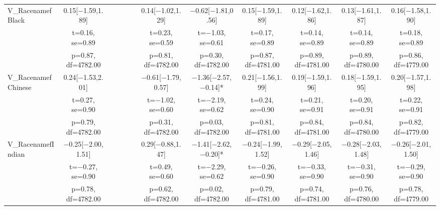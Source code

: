 \documentclass[]{report}
\begin{document}
\begin{table}
{\begin{tabular}[t]{lccccccccccc}
		V\_RacenamefBlack & \num{0.15}[\num{-1.59},\num{1.89}] &  &  &  &  & \num{0.14}[\num{-1.02},\num{1.29}] & \num{-0.62}[\num{-1.81},\num{0.56}] & \num{0.15}[\num{-1.59},\num{1.89}] & \num{0.12}[\num{-1.62},\num{1.86}] & \num{0.13}[\num{-1.61},\num{1.87}] & \num{0.16}[\num{-1.58},\num{1.90}]\\
		& t=\num{0.16}, se=\num{0.89} &  &  &  &  & t=\num{0.23}, se=\num{0.59} & t=\num{-1.03}, se=\num{0.61} & t=\num{0.17}, se=\num{0.89} & t=\num{0.14}, se=\num{0.89} & t=\num{0.14}, se=\num{0.89} & t=\num{0.18}, se=\num{0.89}\\
		& p=\num{0.87}, df=\num{4782.00} &  &  &  &  & p=\num{0.81}, df=\num{4782.00} & p=\num{0.30}, df=\num{4782.00} & p=\num{0.87}, df=\num{4781.00} & p=\num{0.89}, df=\num{4781.00} & p=\num{0.89}, df=\num{4780.00} & p=\num{0.86}, df=\num{4779.00}\\
		V\_RacenamefChinese & \num{0.24}[\num{-1.53},\num{2.01}] &  &  &  &  & \num{-0.61}[\num{-1.79},\num{0.57}] & \num{-1.36}[\num{-2.57},\num{-0.14}]* & \num{0.21}[\num{-1.56},\num{1.99}] & \num{0.19}[\num{-1.59},\num{1.96}] & \num{0.18}[\num{-1.59},\num{1.95}] & \num{0.20}[\num{-1.57},\num{1.98}]\\
		& t=\num{0.27}, se=\num{0.90} &  &  &  &  & t=\num{-1.02}, se=\num{0.60} & t=\num{-2.19}, se=\num{0.62} & t=\num{0.24}, se=\num{0.90} & t=\num{0.21}, se=\num{0.91} & t=\num{0.20}, se=\num{0.91} & t=\num{0.22}, se=\num{0.91}\\
		& p=\num{0.79}, df=\num{4782.00} &  &  &  &  & p=\num{0.31}, df=\num{4782.00} & p=\num{0.03}, df=\num{4782.00} & p=\num{0.81}, df=\num{4781.00} & p=\num{0.84}, df=\num{4781.00} & p=\num{0.84}, df=\num{4780.00} & p=\num{0.82}, df=\num{4779.00}\\
		V\_RacenamefIndian & \num{-0.25}[\num{-2.00},\num{1.51}] &  &  &  &  & \num{0.29}[\num{-0.88},\num{1.47}] & \num{-1.41}[\num{-2.62},\num{-0.20}]* & \num{-0.24}[\num{-1.99},\num{1.52}] & \num{-0.29}[\num{-2.05},\num{1.46}] & \num{-0.28}[\num{-2.03},\num{1.48}] & \num{-0.26}[\num{-2.01},\num{1.50}]\\
		& t=\num{-0.27}, se=\num{0.90} &  &  &  &  & t=\num{0.49}, se=\num{0.60} & t=\num{-2.29}, se=\num{0.62} & t=\num{-0.26}, se=\num{0.90} & t=\num{-0.33}, se=\num{0.90} & t=\num{-0.31}, se=\num{0.90} & t=\num{-0.29}, se=\num{0.90}\\
		& p=\num{0.78}, df=\num{4782.00} &  &  &  &  & p=\num{0.62}, df=\num{4782.00} & p=\num{0.02}, df=\num{4782.00} & p=\num{0.79}, df=\num{4781.00} & p=\num{0.74}, df=\num{4781.00} & p=\num{0.76}, df=\num{4780.00} & p=\num{0.78}, df=\num{4779.00}\\

\end{tabular}}
\end{table}
\end{document}
